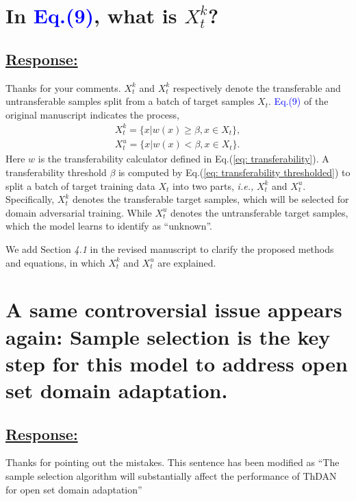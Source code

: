 \section{In \textcolor{blue}{Eq.(9)}, what is  $X_t^k$?}
\subsection*{\underline{\textbf{Response:}}}

Thanks for your comments.
$X_t^k$ and $X_t^k$ respectively denote the transferable and untransferable samples split from a batch of target samples $X_t$.
\textcolor{blue}{Eq.(9)} of the original manuscript indicates the process,
\begin{equation}
    \label{eq: split target examples}
    \begin{split}
        X_t^k=\{x|w(x) \geq \beta, x \in X_t \}, \\
        X_t^u=\{x|w(x) < \beta, x \in X_t \}.
    \end{split}
\end{equation}
Here $w$ is the transferability calculator defined in Eq.(\ref{eq: transferability}).
A transferability threshold $\beta$ is computed by Eq.(\ref{eq: transferability thresholded}) to split a batch of target training data $X_t$ into two parts, \textit{i.e.,} $X_t^k$ and $X_t^u$.
Specifically, $X_t^k$ denotes the transferable target samples, which will be selected for domain adversarial training.
While $X_t^u$ denotes the untransferable target samples, which the model learns to identify as ``unknown''.

We add Section \textit{4.1} in the revised manuscript to clarify the proposed methods and equations, in which $X_t^k$ and $X_t^u$ are explained.

\section{A same controversial issue appears again: Sample selection is the key step for this model to address open set domain adaptation.}
\subsection*{\underline{\textbf{Response:}}}

Thanks for pointing out the mistakes.
This sentence has been modified as ``The sample selection algorithm will substantially affect the performance of ThDAN for open set domain adaptation''

